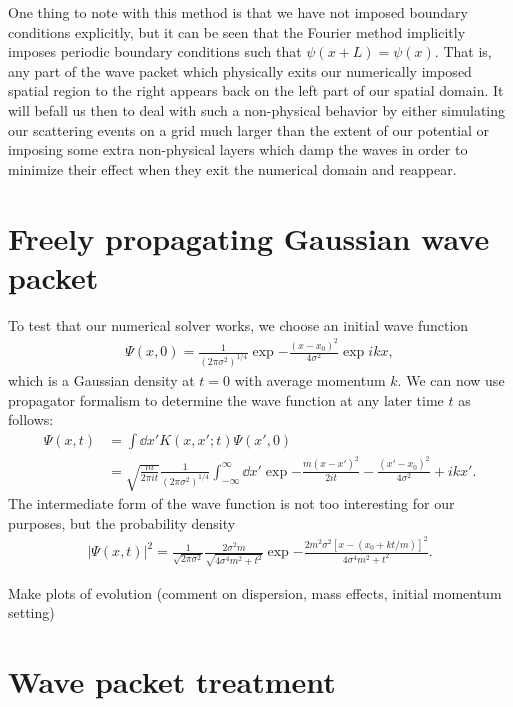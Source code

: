One thing to note with this method is that we have not imposed boundary conditions explicitly, but it can be seen that the Fourier method implicitly imposes periodic boundary conditions such that $\psi(x + L) = \psi(x)$.
That is, any part of the wave packet which physically exits our numerically imposed spatial region to the right appears back on the left part of our spatial domain.
It will befall us then to deal with such a non-physical behavior by either simulating our scattering events on a grid much larger than the extent of our potential or imposing some extra non-physical layers which damp the waves in order to minimize their effect when they exit the numerical domain and reappear.


\section{Freely propagating Gaussian wave packet}
\label{sec:freely-propagating-gaussian-wave-packet}

To test that our numerical solver works, we choose an initial wave function
\begin{align}
    \Psi(x,0) = \frac{1}{(2 \pi \sigma^2)^{1/4}} \exp{-\frac{(x - x_{0})^2}{4 \sigma^2}} \exp{i k x}
,\end{align}
which is a Gaussian density at $t = 0$ with average momentum $k$.
We can now use propagator formalism to determine the wave function at any later time $t$ as follows:
\begin{align}
    \Psi(x,t) &= \int \dd{x'} K(x,x';t) \Psi(x',0) \nonumber \\
              &= \sqrt{\frac{m}{2 \pi i t}} \frac{1}{(2 \pi \sigma^2)^{1/4}} \int_{-\infty}^{\infty} \dd{x'} \exp{-\frac{m(x - x')^2}{2 i t} - \frac{(x' - x_0)^2}{4 \sigma^2} + i k x'}
.\end{align}
The intermediate form of the wave function is not too interesting for our purposes, but the probability density
\begin{align}
    |\Psi(x,t)|^2 = \frac{1}{\sqrt{2 \pi \sigma^2}} \frac{2 \sigma^2 m}{\sqrt{ 4 \sigma^4 m^2 + t^2 }} \exp{ -\frac{2 m^2 \sigma^2 [ x - (x_0 + k t / m) ]^2}{4 \sigma^{4} m^2 + t^2} }
.\end{align}

{\color{red}
    Make plots of evolution (comment on dispersion, mass effects, initial momentum setting)
}


\section{Wave packet treatment}
\label{sec:wave-packet-treatment}

